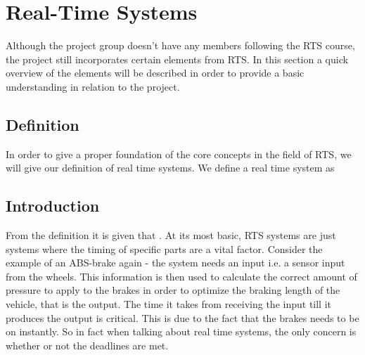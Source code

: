 \section{Real-Time Systems}
Although the project group doesn't have any members following the RTS course,
the project still incorporates certain elements from RTS. In this section a
quick overview of the elements will be described in order to provide a basic
understanding in relation to the project.

\subsection{Definition}
In order to give a proper foundation of the core concepts in the field of RTS,
we will give our definition of real time systems. We define a real time system
as  

\subsection{Introduction}
From the definition it is given that . At its most basic, RTS systems are
just systems where the timing of specific parts are a vital factor. Consider
the example of an ABS-brake again - the system needs an input i.e. a sensor
input from the wheels. This information is then used to calculate the correct
amount of pressure to apply to the brakes in order to optimize  the braking
length of the vehicle, that is the output. The time it takes from receiving 
the input till it produces the output is critical. This is due to the fact that
the brakes needs to be on instantly. So in fact when talking about
real time systems, the only concern is whether or not the deadlines are met.

